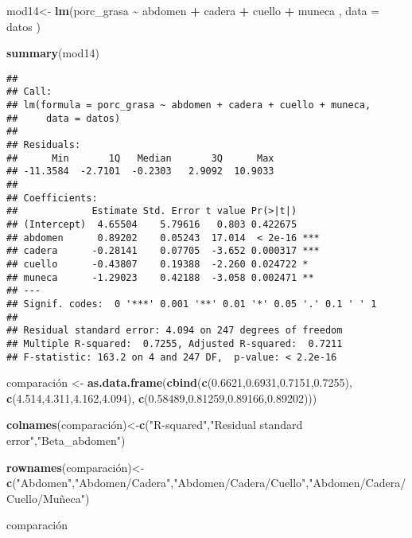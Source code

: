 \documentclass[
]{article}
\newenvironment{Shaded}{\begin{snugshade}}{\end{snugshade}}
\newcommand{\AttributeTok}[1]{\textcolor[rgb]{0.13,0.29,0.53}{#1}}
\newcommand{\FloatTok}[1]{\textcolor[rgb]{0.00,0.00,0.81}{#1}}
\newcommand{\FunctionTok}[1]{\textcolor[rgb]{0.13,0.29,0.53}{\textbf{#1}}}
\newcommand{\NormalTok}[1]{#1}
\newcommand{\OtherTok}[1]{\textcolor[rgb]{0.56,0.35,0.01}{#1}}
\newcommand{\SpecialCharTok}[1]{\textcolor[rgb]{0.81,0.36,0.00}{\textbf{#1}}}
\newcommand{\StringTok}[1]{\textcolor[rgb]{0.31,0.60,0.02}{#1}}
\begin{document}
\begin{Shaded}
\begin{Highlighting}[]
\NormalTok{mod14}\OtherTok{\textless{}{-}} \FunctionTok{lm}\NormalTok{(porc\_grasa }\SpecialCharTok{\textasciitilde{}}\NormalTok{  abdomen }\SpecialCharTok{+}\NormalTok{ cadera }\SpecialCharTok{+}\NormalTok{ cuello }\SpecialCharTok{+}\NormalTok{ muneca , }\AttributeTok{data =}\NormalTok{ datos )}

\FunctionTok{summary}\NormalTok{(mod14)}
\end{Highlighting}
\end{Shaded}

\begin{verbatim}
## 
## Call:
## lm(formula = porc_grasa ~ abdomen + cadera + cuello + muneca, 
##     data = datos)
## 
## Residuals:
##      Min       1Q   Median       3Q      Max 
## -11.3584  -2.7101  -0.2303   2.9092  10.9033 
## 
## Coefficients:
##             Estimate Std. Error t value Pr(>|t|)    
## (Intercept)  4.65504    5.79616   0.803 0.422675    
## abdomen      0.89202    0.05243  17.014  < 2e-16 ***
## cadera      -0.28141    0.07705  -3.652 0.000317 ***
## cuello      -0.43807    0.19388  -2.260 0.024722 *  
## muneca      -1.29023    0.42188  -3.058 0.002471 ** 
## ---
## Signif. codes:  0 '***' 0.001 '**' 0.01 '*' 0.05 '.' 0.1 ' ' 1
## 
## Residual standard error: 4.094 on 247 degrees of freedom
## Multiple R-squared:  0.7255, Adjusted R-squared:  0.7211 
## F-statistic: 163.2 on 4 and 247 DF,  p-value: < 2.2e-16
\end{verbatim}

\begin{Shaded}
\begin{Highlighting}[]
\NormalTok{comparación }\OtherTok{\textless{}{-}} \FunctionTok{as.data.frame}\NormalTok{(}\FunctionTok{cbind}\NormalTok{(}\FunctionTok{c}\NormalTok{(}\FloatTok{0.6621}\NormalTok{,}\FloatTok{0.6931}\NormalTok{,}\FloatTok{0.7151}\NormalTok{,}\FloatTok{0.7255}\NormalTok{),}
                                   \FunctionTok{c}\NormalTok{(}\FloatTok{4.514}\NormalTok{,}\FloatTok{4.311}\NormalTok{,}\FloatTok{4.162}\NormalTok{,}\FloatTok{4.094}\NormalTok{),}
                                   \FunctionTok{c}\NormalTok{(}\FloatTok{0.58489}\NormalTok{,}\FloatTok{0.81259}\NormalTok{,}\FloatTok{0.89166}\NormalTok{,}\FloatTok{0.89202}\NormalTok{)))}

\FunctionTok{colnames}\NormalTok{(comparación)}\OtherTok{\textless{}{-}}\FunctionTok{c}\NormalTok{(}\StringTok{"R{-}squared"}\NormalTok{,}\StringTok{"Residual standard error"}\NormalTok{,}\StringTok{"Beta\_abdomen"}\NormalTok{)}

\FunctionTok{rownames}\NormalTok{(comparación)}\OtherTok{\textless{}{-}}\FunctionTok{c}\NormalTok{(}\StringTok{"Abdomen"}\NormalTok{,}\StringTok{"Abdomen/Cadera"}\NormalTok{,}\StringTok{"Abdomen/Cadera/Cuello"}\NormalTok{,}\StringTok{"Abdomen/Cadera/Cuello/Muñeca"}\NormalTok{)}

\NormalTok{comparación}
\end{Highlighting}
\end{Shaded}
\end{document}
